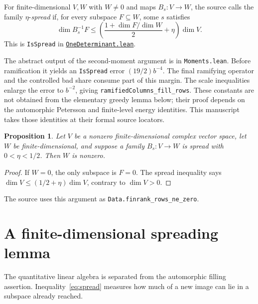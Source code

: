 \documentclass[11pt,oneside,openany]{amsbook}
\newtheorem{proposition}[theorem]{Proposition}
\theoremstyle{remark}
\numberwithin{equation}{section}
\newcommand{\ghroot}{https://github.com/lsernau/grh-lean/blob/}
\newcommand{\ghrev}{72fead102f663d5c7a407964a13dc0cf9d977207}
\newcommand{\leanfile}[2]{%
  \href{\ghroot\ghrev/grh-compact/src/#1}{\nolinkurl{#2}}}
\begin{document}
For finite-dimensional $V,W$ with $W\ne0$ and maps
$B_s:V\to W$, the source calls the family
$\eta$-\emph{spread} if, for every subspace $F\subseteq W$,
some $s$ satisfies
\begin{equation}
\label{eq:spread}
\dim B_s^{-1}F\le
\left(\frac{1+\dim F/\dim W}{2}+\eta\right)\dim V.
\end{equation}
This is \texttt{IsSpread} in
\leanfile{New/Heights/OneDeterminant.lean}%
{OneDeterminant.lean}.

The abstract output of the second-moment argument is
in \texttt{Moments.lean}. Before ramification it yields
an \texttt{IsSpread} error $(19/2)b^{-4}$. The final
ramifying operator and the controlled bad share consume
part of this margin. The scale inequalities enlarge the
error to $b^{-2}$, giving
\texttt{ramifiedColumns\_fill\_rows}. These constants
are not obtained from the elementary greedy lemma below;
their proof depends on the automorphic Petersson and
finite-level energy identities. This manuscript takes
those identities at their formal source locators.

\begin{proposition}
\label{prop:rows-nonzero}
Let $V$ be a nonzero finite-dimensional complex vector
space, let $W$ be finite-dimensional, and suppose a
family $B_s:V\to W$ is spread with $0<\eta<1/2$.
Then $W$ is nonzero.
\end{proposition}
\begin{proof}
If $W=0$, the only subspace is $F=0$. The spread
inequality says $\dim V\le(1/2+\eta)\dim V$, contrary
to $\dim V>0$.
\end{proof}
The source uses this argument as
\texttt{Data.finrank\_rows\_ne\_zero}.

\section{A finite-dimensional spreading lemma}
\label{sec:spread}
The quantitative linear algebra is separated from the
automorphic filling assertion. Inequality~\eqref{eq:spread}
measures how much of a new image can lie in a subspace
already reached.
\end{document}

